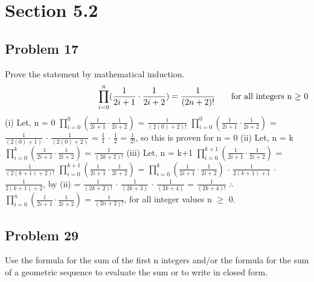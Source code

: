 \documentclass{article}
\begin{document}
	
	
	\section*{Section 5.2}
	\subsection*{Problem 17}	
	Prove the statement by mathematical induction.
	\begin{align*}
	 \hspace{10em}&& \prod_{i=0}^{n}(\frac{1}{2i+1}\cdot\frac{1}{2i+2}) = \frac{1}{(2n+2)!}
	&&\parbox[t]{10em}{\raggedleft for all integers n $\geq$ 0} 
	\end{align*}
	\newline
	(i) Let, n = 0
	\newline
	$\prod_{i=0}^{0}(\frac{1}{2i+1}\cdot\frac{1}{2i+2})$ = $\frac{1}{(2(0)+2)!}$
	\newline
	$\prod_{i=0}^{0}(\frac{1}{2i+1}\cdot\frac{1}{2i+2})$ = $\frac{1}{(2(0)+1)}$ $\cdot$ $\frac{1}{(2(0)+2)}$
	\newline
	= $\frac{1}{1}$ $\cdot$ $\frac{1}{2}$ = $\frac{1}{2!}$, so this is proven for n = 0
	\newline
	(ii) Let, n = k
	\newline
	$\prod_{i=0}^{k}(\frac{1}{2i+1}\cdot\frac{1}{2i+2})$ = $\frac{1}{(2k+2)!}$
	\newline
	(iii) Let, n = k+1
	\newline
	$\prod_{i=0}^{k+1}(\frac{1}{2i+1}\cdot\frac{1}{2i+2})$ = $\frac{1}{(2(k+1)+2)!}$
	\newline
	$\prod_{i=0}^{k+1}(\frac{1}{2i+1}\cdot\frac{1}{2i+2})$ = $\prod_{i=0}^{k}(\frac{1}{2i+1}\cdot\frac{1}{2i+2})$ $\cdot$ $\frac{1}{2(k+1)+1}$ $\cdot$ $\frac{1}{2(k+1)+2}$, by (ii)
	\newline
	= $\frac{1}{(2k+2)!}$ $\cdot$ $\frac{1}{(2k+3)}$ $\cdot$ $\frac{1}{(2k+4)}$
	\newline
	= $\frac{1}{(2k+4)!}$
	\newline
	$\therefore$ $\prod_{i=0}^{n}(\frac{1}{2i+1}\cdot\frac{1}{2i+2})$ = $\frac{1}{(2n+2)!}$, for all integer values n $\geq$ 0.

	\subsection*{Problem 29}
	Use the formula for the sum of the first n integers and/or the formula for the sum of a geometric sequence to evaluate the sum or to write in closed form.
	
\end{document}
